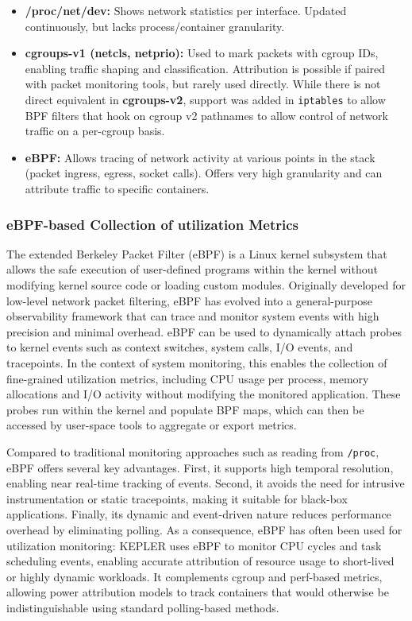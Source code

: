 \begin{itemize}
    \item \textbf{/proc/net/dev:} Shows network statistics per interface. Updated continuously, but lacks process/container granularity.
    \item \textbf{cgroups-v1 (net\textunderscore cls, net\textunderscore prio):} Used to mark packets with cgroup IDs, enabling traffic shaping and classification. Attribution is possible if paired with packet monitoring tools, but rarely used directly. While there is not direct equivalent in \textbf{cgroups-v2}, support was added in \texttt{iptables} to allow BPF filters that hook on cgroup v2 pathnames to allow control of network traffic on a per-cgroup basis.
    \item \textbf{eBPF:} Allows tracing of network activity at various points in the stack (packet ingress, egress, socket calls). Offers very high granularity and can attribute traffic to specific containers.
\end{itemize}

\subsubsection{eBPF-based Collection of utilization Metrics}
\label{sec:ebpf_metrics}

The extended Berkeley Packet Filter (eBPF) is a Linux kernel subsystem that allows the safe execution of user-defined programs within the kernel without modifying kernel source code or loading custom modules. Originally developed for low-level network packet filtering, eBPF has evolved into a general-purpose observability framework that can trace and monitor system events with high precision and minimal overhead. eBPF can be used to dynamically attach probes to kernel events such as context switches, system calls, I/O events, and tracepoints. In the context of system monitoring, this enables the collection of fine-grained utilization metrics, including CPU usage per process, memory allocations and I/O activity without modifying the monitored application. These probes run within the kernel and populate BPF maps, which can then be accessed by user-space tools to aggregate or export metrics.

Compared to traditional monitoring approaches such as reading from \texttt{/proc}, eBPF offers several key advantages. First, it supports high temporal resolution, enabling near real-time tracking of events. Second, it avoids the need for intrusive instrumentation or static tracepoints, making it suitable for black-box applications. Finally, its dynamic and event-driven nature reduces performance overhead by eliminating polling. As a consequence, eBPF has often been used for utilization monitoring: KEPLER uses eBPF to monitor CPU cycles and task scheduling events, enabling accurate attribution of resource usage to short-lived or highly dynamic workloads. It complements cgroup and perf-based metrics, allowing power attribution models to track containers that would otherwise be indistinguishable using standard polling-based methods.

